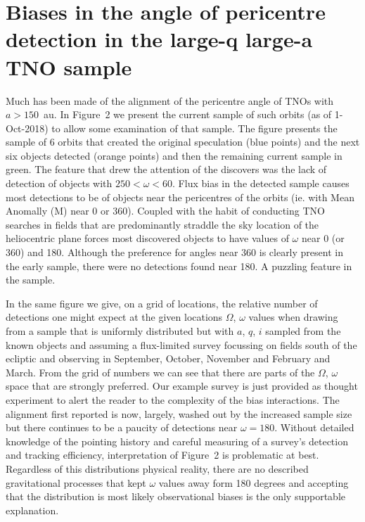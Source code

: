 \documentclass{aastex62}
\begin{document}
\section{Biases in the angle of pericentre detection in the large-q large-a TNO sample}

Much has been made of the alignment of the pericentre angle of TNOs with $a>150$~au.  In Figure~2 we present the current sample of such orbits (as of 1-Oct-2018) to allow some examination of that sample.  The figure presents the sample of 6 orbits that created the original speculation (blue points) and the next six objects detected (orange points) and then the remaining current sample in green.  The feature that drew the attention of the discovers was the lack of detection of objects with $250< \omega < 60$.  Flux bias in the detected sample causes most detections to be of objects near the pericentres of the orbits (ie. with Mean Anomally (M) near 0 or 360).   Coupled with the habit of conducting TNO searches in fields that are predominantly straddle the sky location of the heliocentric plane forces most discovered objects to have values of $\omega$ near 0 (or 360) and 180.  Although the preference for angles near 360 is clearly present in the early sample, there were no detections found near 180.  A puzzling feature in the sample.

In the same figure we give, on a grid of locations, the relative number of detections one might expect at the given locations $\Omega$, $\omega$ values when drawing from a sample that is uniformly distributed but with $a$, $q$, $i$ sampled from the known objects and assuming a flux-limited survey focussing on fields south of the ecliptic and observing in September, October, November and February and March.  From the grid of numbers we can see that there are parts of the $\Omega$, $\omega$ space that are strongly preferred.  Our example survey is just provided as thought experiment to alert the reader to the complexity of the bias interactions. The alignment first reported is now, largely, washed out by the increased sample size but there continues to be a paucity of detections near $\omega = 180$.  Without detailed knowledge of the pointing history and careful measuring of a survey's detection and tracking efficiency, interpretation of Figure~2 is problematic at best.   Regardless of this distributions physical reality, there are no described gravitational processes that  kept $\omega$ values away form 180 degrees and accepting that the distribution is most likely observational biases is the only supportable explanation.
\end{document}
